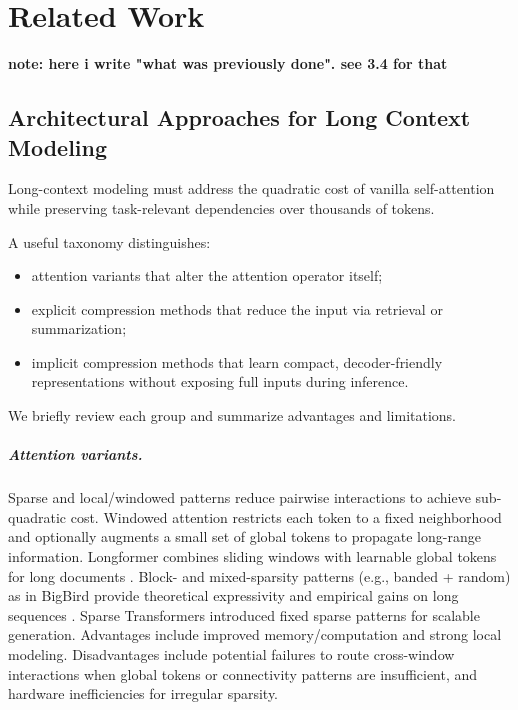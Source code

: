 \chapter{Related Work}

\textbf{note: here i write "what was previously done". see 3.4 for that}


\section{Architectural Approaches for Long Context Modeling}

Long-context modeling must address the quadratic cost of vanilla self-attention \cite{vaswani_attention_2017} while preserving task-relevant dependencies over thousands of tokens.

A useful taxonomy distinguishes:
\begin{itemize}
    \item attention variants that alter the attention operator itself;
    \item explicit compression methods that reduce the input via retrieval or summarization;
    \item implicit compression methods that learn compact, decoder-friendly representations without exposing full inputs during inference.
\end{itemize}

We briefly review each group and summarize advantages and limitations.

\paragraph{Attention variants.}
Sparse and local/windowed patterns reduce pairwise interactions to achieve sub-quadratic cost.
Windowed attention restricts each token to a fixed neighborhood and optionally augments a small set of global tokens to propagate long-range information.
Longformer combines sliding windows with learnable global tokens for long documents \cite{beltagy_longformer_2020}.
Block- and mixed-sparsity patterns (e.g., banded + random) as in BigBird provide theoretical expressivity and empirical gains on long sequences \cite{zaheer_bigbird_2020}.
Sparse Transformers \cite{child_sparse_2019} introduced fixed sparse patterns for scalable generation.
Advantages include improved memory/computation and strong local modeling.
Disadvantages include potential failures to route cross-window interactions when global tokens or connectivity patterns are insufficient, and hardware inefficiencies for irregular sparsity.

